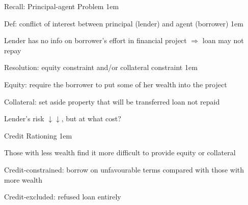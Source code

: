 \documentclass[11pt,aspectratio=43,usenames,dvipsnames]{beamer}
\let\olditemize=\itemize
\let\endolditemize=\enditemize
\renewenvironment{itemize}{\olditemize \itemsep1em}{\endolditemize}
\theoremstyle{definition}
\begin{document}
\begin{frame}{Recall: Principal-agent Problem}
\label{slide:Recall__Principal_agent_Problem}
    \begin{itemize}
        \item Def: conflict of interest between principal (\alert{lender}) and agent (\alert{borrower})
        \begin{itemize}
            \item Lender has no info on borrower's effort in financial project $ \Rightarrow  $ loan may not repay
        \end{itemize}
        \item Resolution: \alert{equity constraint} and/or \alert{collateral constraint}
        \begin{itemize}
            \item Equity: require the borrower to put some of her wealth into the project
            \item Collateral: set aside property that will be transferred loan not repaid
        \end{itemize}
        \item Lender's risk $ \downarrow \downarrow  $, but at what cost?
    \end{itemize}

\end{frame}

\begin{frame}{Credit Rationing}
\label{slide:Credit_Rationing}
    \begin{itemize}
        \item Those with less wealth find it more difficult to provide equity or collateral
        \item \alert{Credit-constrained}: borrow on unfavourable terms compared with those with more wealth
        \item \alert{Credit-excluded}: refused loan entirely
    \end{itemize}

\end{frame}
\end{document}
